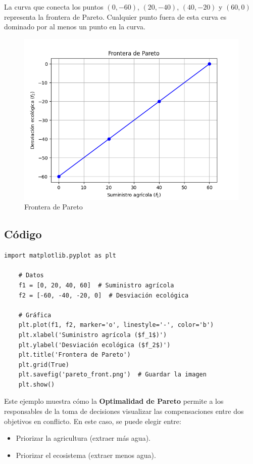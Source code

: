\documentclass[12pt]{article}
\begin{document}
La curva que conecta los puntos \((0, -60)\), \((20, -40)\), \((40, -20)\) y \((60, 0)\) representa la frontera de Pareto. Cualquier punto fuera de esta curva es dominado por al menos un punto en la curva.

\begin{figure}[h]
	\centering
	\includegraphics[width=0.9\linewidth]{Figure_pareto.png}
	\caption{Frontera de Pareto}
	\label{Pareto}
\end{figure}

\clearpage  %

\subsection*{Código}
\begin{lstlisting}[style=python]
	import matplotlib.pyplot as plt
	
	# Datos
	f1 = [0, 20, 40, 60]  # Suministro agrícola
	f2 = [-60, -40, -20, 0]  # Desviación ecológica
	
	# Gráfica
	plt.plot(f1, f2, marker='o', linestyle='-', color='b')
	plt.xlabel('Suministro agrícola ($f_1$)')
	plt.ylabel('Desviación ecológica ($f_2$)')
	plt.title('Frontera de Pareto')
	plt.grid(True)
	plt.savefig('pareto_front.png')  # Guardar la imagen
	plt.show()
\end{lstlisting}

Este ejemplo muestra cómo la \textbf{Optimalidad de Pareto} permite a los responsables de la toma de decisiones visualizar las compensaciones entre dos objetivos en conflicto. En este caso, se puede elegir entre:
\begin{itemize}
	\item Priorizar la agricultura (extraer más agua).
	\item Priorizar el ecosistema (extraer menos agua).
\end{itemize}
\end{document}
